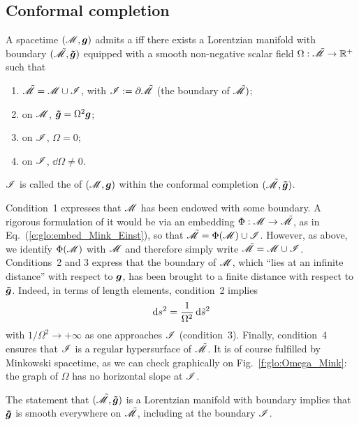 \subsection{Conformal completion} \label{s:glo:def_conf_compl}

\begin{greybox}
A spacetime $(\mathscr{M},\bm{g})$ admits a
iff there exists a Lorentzian manifold with boundary
$(\tilde{\mathscr{M}},\bm{\tilde{g}})$ equipped with a smooth non-negative scalar field
$\Omega: \tilde{\mathscr{M}} \rightarrow \mathbb{R}^+$
such that
\begin{enumerate}
\item $\tilde{\mathscr{M}} = \mathscr{M} \cup \mathscr{I}$, with $\mathscr{I} := \partial \tilde{\mathscr{M}}$
(the boundary of $\tilde{\mathscr{M}})$;
\item on $\mathscr{M}$, $\bm{\tilde{g}} = \Omega^2 \bm{g}$;
\item on $\mathscr{I}$, $\Omega=0$;
\item on $\mathscr{I}$, $\dd \Omega \not= 0$.
\end{enumerate}
$\mathscr{I}$ is called the 
of $(\mathscr{M},\bm{g})$ within
the conformal completion $(\tilde{\mathscr{M}},\bm{\tilde{g}})$.
\end{greybox}
Condition~1 expresses that $\mathscr{M}$ has been endowed with some boundary.
A rigorous formulation of it would be via an embedding $\Phi:\mathscr{M} \rightarrow \tilde{\mathscr{M}}$,
as in Eq.~(\ref{e:glo:embed_Mink_Einst}), so that
$\tilde{\mathscr{M}} = \Phi(\mathscr{M}) \cup \mathscr{I}$. However, as above, we identify $\Phi(\mathscr{M})$
with $\mathscr{M}$ and therefore simply write $\tilde{\mathscr{M}} = \mathscr{M} \cup \mathscr{I}$.
Conditions~2 and 3 express that the boundary of $\mathscr{M}$, which ``lies at an infinite
distance'' with respect to $\bm{g}$, has been brought to a
finite distance with respect to $\bm{\tilde{g}}$. Indeed, in terms of
length elements, condition~2
implies
\[
    \mathrm{d} s^2 = \frac{1}{\Omega^2} \, \mathrm{d} {\tilde s}^2
\]
with $1/\Omega^2 \rightarrow +\infty$ as one approaches $\mathscr{I}$
(condition~3).
Finally, condition~4 ensures
that $\mathscr{I}$ is a regular hypersurface of $\tilde{\mathscr{M}}$.
It is of course fulfilled by Minkowski spacetime, as we can check graphically
on Fig.~\ref{f:glo:Omega_Mink}: the graph of $\Omega$ has no horizontal slope
at $\mathscr{I}$.

\begin{remark}
The statement that $(\tilde{\mathscr{M}},\bm{\tilde{g}})$ is a Lorentzian manifold with
boundary implies that $\bm{\tilde{g}}$ is smooth everywhere on $\tilde{\mathscr{M}}$,
including at the boundary $\mathscr{I}$.
\end{remark}

